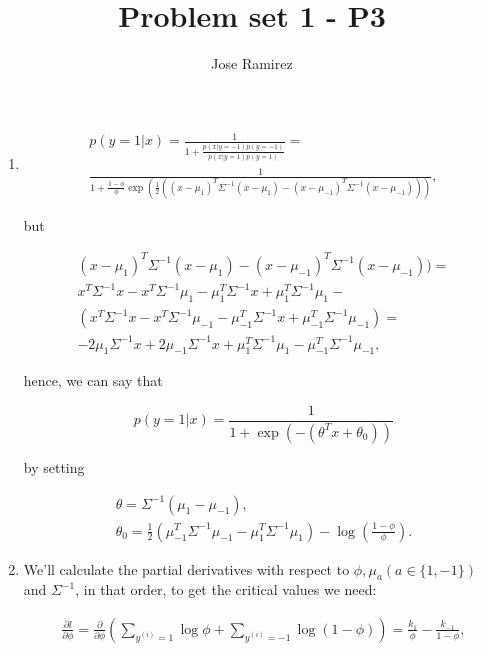 \documentclass{article}
\title{Problem set 1 - P3}
\author{Jose Ramirez}
\begin{document}
\maketitle

\begin{enumerate}
\item
\begin{eqnarray*}
	p(y = 1 | x) = \frac{1}{1 + \frac{p(x|y = -1)p(y = -1)}{p(x|y = 1)p(y = 1)}} = \\
	\frac{1}{1 + \frac{1 - \phi}{\phi} \exp(\frac{1}{2}((x - \mu_{1})^T\Sigma^{-1}(x - \mu_{1}) - (x - \mu_{-1})^T\Sigma^{-1}(x - \mu_{-1})))},
\end{eqnarray*}

but

\begin{eqnarray*}
	(x - \mu_{1})^T\Sigma^{-1}(x - \mu_{1}) - (x - \mu_{-1})^T\Sigma^{-1}(x - \mu_{-1})) = \\
	x^T\Sigma^{-1}x - x^T\Sigma^{-1}\mu_{1} - \mu_{1}^T\Sigma^{-1}x + \mu_{1}^T\Sigma^{-1}\mu_{1} - \\
	(x^T\Sigma^{-1}x - x^T\Sigma^{-1}\mu_{-1} - \mu_{-1}^T\Sigma^{-1}x + \mu_{-1}^T\Sigma^{-1}\mu_{-1}) = \\
	-2\mu_{1}\Sigma^{-1}x + 2\mu_{-1}\Sigma^{-1}x + \mu_{1}^T\Sigma^{-1}\mu_{1} - \mu_{-1}^T\Sigma^{-1}\mu_{-1},
\end{eqnarray*}

hence, we can say that 

$$
	p(y = 1 | x) = \frac{1}{1 + \exp(-(\theta^Tx + \theta_{0}))}
$$

by setting

\begin{eqnarray*}
	\theta = \Sigma^{-1}(\mu_{1} - \mu_{-1}), \\
	\theta_{0} = \frac{1}{2}\left(\mu_{-1}^T\Sigma^{-1}\mu_{-1} - \mu_{1}^T\Sigma^{-1}\mu_{1}\right) - \log(\frac{1 - \phi}{\phi}).
\end{eqnarray*}

\item We'll calculate the partial derivatives with respect to $\phi, \mu_a (a \in\{1, -1\})$ and $\Sigma^{-1}$, in that order, to get the critical values we need:

\begin{eqnarray*}
	\frac{\partial l}{\partial \phi} = \frac{\partial}{\partial \phi} \left(\sum_{y^{(i)} = 1} \log\phi + \sum_{y^{(i)} = -1} \log(1 - \phi)\right) = \frac{k_1}{\phi} - \frac{k_{-1}}{1 - \phi},
\end{eqnarray*}


\end{enumerate}
\end{document}
